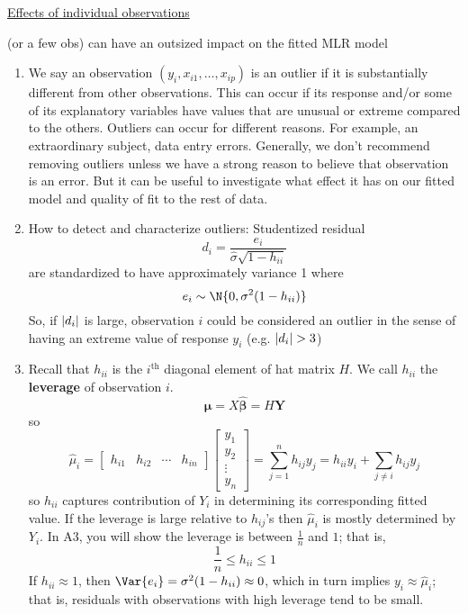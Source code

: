 \underline{Effects of individual observations}

(or a few obs) can have an outsized impact on the fitted
MLR model
\begin{enumerate}[(1)]
    \item We say an observation $ (y_i,x_{i1},\ldots,x_{ip}) $
          is an outlier if it is substantially different from other
          observations. This can occur if its response
          and/or some of its explanatory variables have values that are unusual
          or extreme compared to the others. Outliers can occur
          for different reasons. For example, an extraordinary
          subject, data entry errors. Generally, we don't recommend removing
          outliers unless we have a strong reason to believe that observation
          is an error. But it can be useful to investigate what
          effect it has on our fitted model and quality of fit to
          the rest of data.
    \item How to detect and characterize outliers: Studentized residual
          \[ d_i=\frac{e_i}{\hat{\sigma}\sqrt{1-h_{ii}}}  \]
          are standardized to have approximately variance 1 where
          \[ e_i\sim\N{0,\sigma^2(1-h_{ii})} \]
          So, if $ \lvert d_i\rvert $ is large, observation $ i $ could
          be considered an outlier in the sense of having an
          extreme value of response $ y_i $ (e.g. $ \lvert d_i\rvert>3 $)
    \item Recall that $ h_{ii} $ is the $ i^{\text{th}} $ diagonal
          element of hat matrix $ H $. We call $ h_{ii} $ the \textbf{leverage}
          of observation $ i $.
          \[ \hat{\symbf{\mu}}=X\hat{\symbf{\beta}}=H\symbf{Y} \]
          so
          \[ \hat{\mu}_i=\begin{bmatrix}
                  h_{i1} & h_{i2} & \cdots & h_{i n}
              \end{bmatrix}\begin{bmatrix}
                  y_1    \\
                  y_2    \\
                  \vdots \\
                  y_n
              \end{bmatrix}=\sum_{j=1}^{n} h_{i j}y_j
              =h_{ii}y_i+\sum_{j\neq i}h_{i j}y_j  \]
          so $ h_{ii} $ captures contribution of $ Y_i $ in determining
          its corresponding fitted value. If the leverage is large
          relative to $ h_{ij} $'s then $ \hat{\mu}_i $
          is mostly determined by $ Y_i $. In A3, you will show
          the leverage is between $ \frac{1}{n} $ and $ 1 $; that is,
          \[ \frac{1}{n} \le h_{ii}\le 1 \]
          If $ h_{ii}\approx 1 $, then $ \Var{e_i}=\sigma^2(1-h_{ii})\approx 0 $,
          which in turn implies $ y_i\approx \hat{\mu}_i $; that is,
          residuals with observations with high leverage tend to be small.


\end{enumerate}
